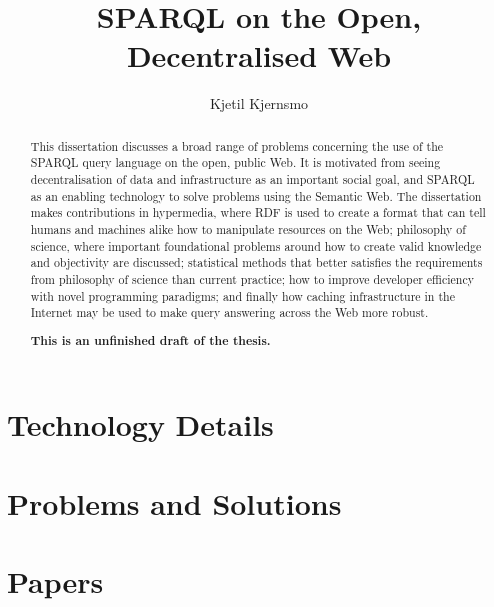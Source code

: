 \documentclass[a4paper, 12pt]{uiophd}
\begin{document}
\title{SPARQL on the Open, Decentralised Web}
\author{Kjetil Kjernsmo}


\frontmatter
\maketitle


\begin{abstract}
  This dissertation discusses a broad range of problems concerning the
  use of the SPARQL query language on the open, public Web. It is
  motivated from seeing decentralisation of data and infrastructure as
  an important social goal, and SPARQL as an enabling technology to
  solve problems using the Semantic Web. The dissertation makes
  contributions in hypermedia, where RDF is used to create a format
  that can tell humans and machines alike how to manipulate resources
  on the Web; philosophy of science, where important foundational
  problems around how to create valid knowledge and objectivity are
  discussed; statistical methods that better satisfies the
  requirements from philosophy of science than current practice; how
  to improve developer efficiency with novel programming paradigms;
  and finally how caching infrastructure in the Internet may be used
  to make query answering across the Web more robust.

  \textbf{This is an unfinished draft of the thesis.}
\end{abstract}

\tableofcontents
\mainmatter






\chapter{Technology Details}



\chapter{Problems and Solutions}









\chapter{Papers}







\end{document}
